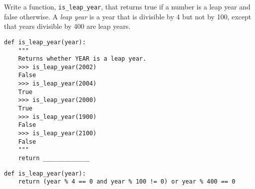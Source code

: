 \begin{blocksection}
\question Write a function, \lstinline$is_leap_year$, that returns true if a number is a leap year and false otherwise.
A \emph{leap year} is a year that is divisible by 4 but not by 100, except that years divisible by 400 are leap years. 

\begin{lstlisting}
def is_leap_year(year):
    """
    Returns whether YEAR is a leap year. 
    >>> is_leap_year(2002)
    False
    >>> is_leap_year(2004)
    True
    >>> is_leap_year(2000)
    True
    >>> is_leap_year(1900)
    False
    >>> is_leap_year(2100)
    False
    """
    return _____________
\end{lstlisting}


\begin{solution}[2in]
\begin{lstlisting}
def is_leap_year(year):
    return (year % 4 == 0 and year % 100 != 0) or year % 400 == 0
\end{lstlisting}
\end{solution}
\end{blocksection}